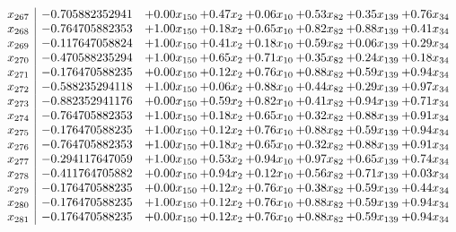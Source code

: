\documentclass[8pt]{article}
\begin{document}
\[\begin{array}{c| c c@{\hskip 2pt} c@{\hskip 2pt} c@{\hskip 2pt} c@{\hskip 2pt} c@{\hskip 2pt} c@{\hskip 2pt} }
 x_{267}   &  -0.705882352941 & +  0.00 x_{150} & +  0.47 x_{2} & +  0.06 x_{10} & +  0.53 x_{82} & +  0.35 x_{139} & +  0.76 x_{34}\\
 x_{268}   &  -0.764705882353 & +  1.00 x_{150} & +  0.18 x_{2} & +  0.65 x_{10} & +  0.82 x_{82} & +  0.88 x_{139} & +  0.41 x_{34}\\
 x_{269}   &  -0.117647058824 & +  1.00 x_{150} & +  0.41 x_{2} & +  0.18 x_{10} & +  0.59 x_{82} & +  0.06 x_{139} & +  0.29 x_{34}\\
 x_{270}   &  -0.470588235294 & +  1.00 x_{150} & +  0.65 x_{2} & +  0.71 x_{10} & +  0.35 x_{82} & +  0.24 x_{139} & +  0.18 x_{34}\\
 x_{271}   &  -0.176470588235 & +  0.00 x_{150} & +  0.12 x_{2} & +  0.76 x_{10} & +  0.88 x_{82} & +  0.59 x_{139} & +  0.94 x_{34}\\
 x_{272}   &  -0.588235294118 & +  1.00 x_{150} & +  0.06 x_{2} & +  0.88 x_{10} & +  0.44 x_{82} & +  0.29 x_{139} & +  0.97 x_{34}\\
 x_{273}   &  -0.882352941176 & +  0.00 x_{150} & +  0.59 x_{2} & +  0.82 x_{10} & +  0.41 x_{82} & +  0.94 x_{139} & +  0.71 x_{34}\\
 x_{274}   &  -0.764705882353 & +  1.00 x_{150} & +  0.18 x_{2} & +  0.65 x_{10} & +  0.32 x_{82} & +  0.88 x_{139} & +  0.91 x_{34}\\
 x_{275}   &  -0.176470588235 & +  1.00 x_{150} & +  0.12 x_{2} & +  0.76 x_{10} & +  0.88 x_{82} & +  0.59 x_{139} & +  0.94 x_{34}\\
 x_{276}   &  -0.764705882353 & +  1.00 x_{150} & +  0.18 x_{2} & +  0.65 x_{10} & +  0.32 x_{82} & +  0.88 x_{139} & +  0.91 x_{34}\\
 x_{277}   &  -0.294117647059 & +  1.00 x_{150} & +  0.53 x_{2} & +  0.94 x_{10} & +  0.97 x_{82} & +  0.65 x_{139} & +  0.74 x_{34}\\
 x_{278}   &  -0.411764705882 & +  0.00 x_{150} & +  0.94 x_{2} & +  0.12 x_{10} & +  0.56 x_{82} & +  0.71 x_{139} & +  0.03 x_{34}\\
 x_{279}   &  -0.176470588235 & +  0.00 x_{150} & +  0.12 x_{2} & +  0.76 x_{10} & +  0.38 x_{82} & +  0.59 x_{139} & +  0.44 x_{34}\\
 x_{280}   &  -0.176470588235 & +  1.00 x_{150} & +  0.12 x_{2} & +  0.76 x_{10} & +  0.88 x_{82} & +  0.59 x_{139} & +  0.94 x_{34}\\
 x_{281}   &  -0.176470588235 & +  0.00 x_{150} & +  0.12 x_{2} & +  0.76 x_{10} & +  0.88 x_{82} & +  0.59 x_{139} & +  0.94 x_{34}\\

\end{array}\]
\end{document}
